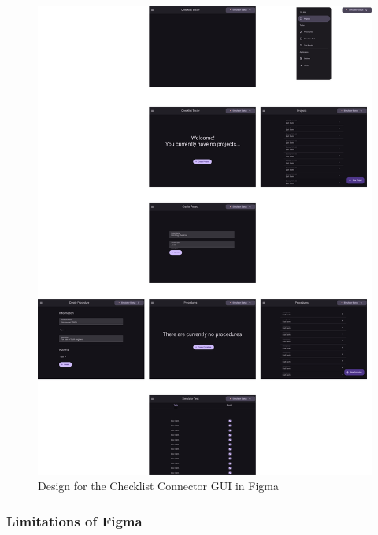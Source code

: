 \documentclass[../dissertation.tex]{subfiles}
\begin{document}
\begin{figure}
  \centering
  \includegraphics[width=\columnwidth]{images/figma-gui.pdf}
  \caption[GUI in Figma]{Design for the Checklist Connector GUI in Figma}
  \label{fig:figma-gui}
\end{figure}

\subsubsection{Limitations of Figma}
\end{document}
